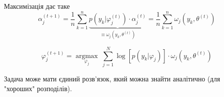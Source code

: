 Максимізація дає таке
\[ \alpha_j^{(t+1)} = \frac{1}{n} \sum_{k=1}^{n} \underbrace{p\left( y_k|\varphi_j^{(t)} \right) \cdot \alpha_j^{(t)}}_{\equiv \omega_j\left( y_k, \theta^{(t)} \right) } = \frac{1}{n} \sum_{k=1}^{n} \omega_j\left( y_k , \theta^{(t)} \right) \] 

\[ \varphi_j^{(t+1)} = \underset{\varphi_j}{\operatorname{argmax}} \; \sum_{j=1}^{N} 
\log \left[ p\left( y_k | \varphi_j \right)  \right] \cdot \omega_j\left( y_k, \theta^{(t)} \right) \]

Задача може мати єдиний розв'язок, який можна знайти аналітично (для "хороших" розподілів).

